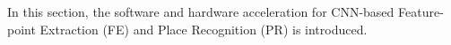\label{sec:hardsoftcodesign}
In this section, the software and hardware acceleration for CNN-based Feature-point Extraction (FE) and Place Recognition (PR) is introduced.